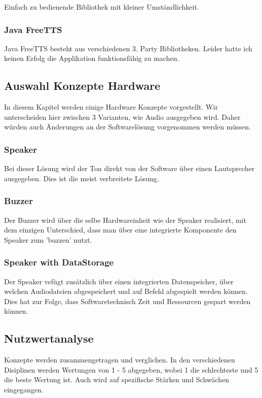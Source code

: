 \documentclass[../../main.tex]{subfiles}
\begin{document}
    Einfach zu bedienende Bibliothek mit kleiner Umständlichkeit.

    \subsubsection{Java FreeTTS}
    Java FreeTTS besteht aus verschiedenen 3. Party Bibliotheken.
    Leider hatte ich keinen Erfolg die Applikation funktionsfähig zu machen.

    \subsection{Auswahl Konzepte Hardware}
    In diesem Kapitel werden einige Hardware Konzepte vorgestellt.
    Wir unterscheiden hier zwischen 3 Varianten, wie Audio ausgegeben wird.
    Daher würden auch Änderungen an der Softwarelösung vorgenommen werden müssen.

    \subsubsection{Speaker}
    Bei dieser Lösung wird der Ton direkt von der Software über einen Lautsprecher ausgegeben.
    Dies ist die meist verbreitete Lösung.\\

    \subsubsection{Buzzer}
    Der Buzzer wird über die selbe Hardwareinheit wie der Speaker realisiert, mit dem einzigen
    Unterschied, dass man über eine integrierte Komponente den Speaker zum 'buzzen' nutzt.

    \subsubsection{Speaker with DataStorage}
    Der Speaker vefügt zusätzlich über einen integrierten Datenspeicher, über welchen Audiodateien abgespeichert
    und auf Befehl abgespielt werden können. Dies hat zur Folge, dass Softwaretechnisch Zeit und Ressourcen gespart werden können.

    \subsection{Nutzwertanalyse}
    Konzepte werden zusammengetragen und verglichen.
    In den verschiedenen Disiplinen werden Wertungen von 1 - 5 abgegeben, wobei 1 die schlechteste und 5 die beste Wertung ist.
    Auch wird auf spezifische Stärken und Schwächen eingegangen.
\end{document}
